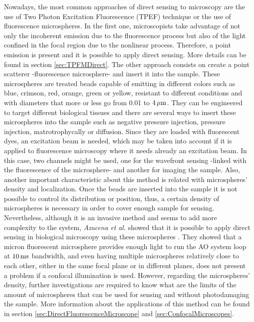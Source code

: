 Nowadays, the most common approaches of direct sensing to microscopy are the use of Two Photon Excitation Fluorescence (TPEF) technique or the use of fluorescence microspheres. In the first one, microscopists take advantage of not only the incoherent emission due to the fluorescence process but also of the light confined in the focal region due to the nonlinear process. Therefore, a point emission is present and it is possible to apply direct sensing. More details can be found in section \ref{sec:TPFMDirect}. The other approach consists on create a point scatterer -fluorescence microsphere- and insert it into the sample. These microspheres are treated beads capable of emitting in different colors such as blue, crimson, red, orange, green or yellow, resistant to different conditions and with diameters that more or less go from 0.01 to $\unit[4]{\mu m}$. They can be engineered to target different biological tissues and there are several ways to insert these microspheres into the sample such as negative pressure injection, pressure injection, matrotrophycally or diffusion. Since they are loaded with fluorescent dyes, an excitation beam is needed, which may be taken into account if it is applied to fluorescence microscopy where it needs already an excitation beam. In this case, two channels might be used, one for the wavefront sensing -linked with the fluorescence of the microsphere- and another for imaging the sample. Also, another important characteristic about this method is related with microspheres' density and localization. Once the beads are inserted into the sample it is not possible to control its distribution or position, thus, a certain density of microspheres is necessary in order to cover enough sample for sensing. Nevertheless, although it is an invasive method and seems to add more complexity to the system, \emph{Azucena et al.} showed that it is possible to apply direct sensing in biological microscopy using these microspheres \cite{wide_fluorescence_guide_star}. They showed that a micron fluorescent microsphere provides enough light to run the AO system loop at $\unit[10]{ms}$ bandwidth, and even having multiple microspheres relatively close to each other, either in the same focal plane or in different planes, does not present a problem if a confocal illumination is used. However, regarding the microspheres' density, further investigations are required to know what are the limits of the amount of microspheres that can be used for sensing and without photodamaging the sample. More information about the applications of this method can be found in section \ref{sec:DirectFluorescenceMicroscope} and \ref{sec:ConfocalMicroscopes}.        

